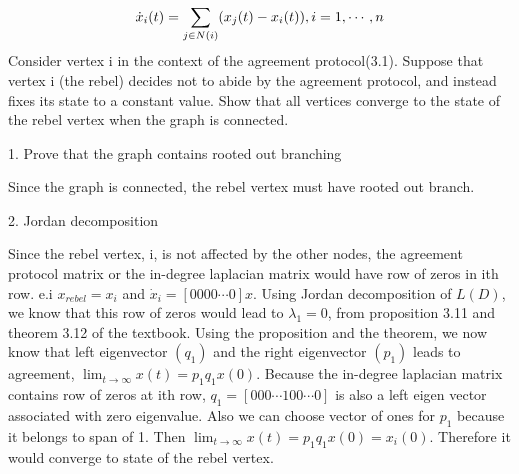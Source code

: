 \documentclass{article}
\begin{document}
\begin{problem}
    \begin{align*}
        \dot{x}_i(t) = \sum_{j \in N(i)} (x_j(t) - x_i(t)), \space i = 1, \cdots , n
    \end{align*}
    Consider vertex i in the context of the agreement protocol(3.1). Suppose that vertex i (the rebel) decides not to abide by the agreement protocol, and instead ﬁxes its state to a constant value. Show that all vertices converge to the state of the rebel vertex when the graph is connected.
    
    1. Prove that the graph contains rooted out branching
    
    Since the graph is connected, the rebel vertex must have rooted out branch.

    2. Jordan decomposition
    
    Since the rebel vertex, i, is not affected by the other nodes, the agreement protocol matrix  or the in-degree laplacian matrix would have row of zeros in ith row. e.i $x_{rebel} = x_i$ and $\dot x_i = [0 0 0 0 \cdots 0] x $. Using Jordan decomposition of $L(D)$, we know that this row of zeros would lead to $\lambda_1 = 0$, from proposition 3.11 and theorem 3.12 of the textbook. Using the proposition and the theorem, we now know that left eigenvector $(q_1)$ and the right eigenvector $(p_1)$ leads to agreement, $\lim_{t\rightarrow \infty} x(t) = p_1 q_1 x(0)$. Because the in-degree laplacian matrix contains row of zeros at ith row, $q_1 = [0 0 0 \cdots 1 0 0 \cdots 0]$ is also a left eigen vector associated with zero eigenvalue.  Also we can choose vector of ones for $p_1$ because it belongs to span of 1. Then $\lim_{t\rightarrow \infty} x(t) = p_1 q_1 x(0) = x_i(0)$. Therefore it would converge to state of the rebel vertex.    
\end{problem}
\end{document}
